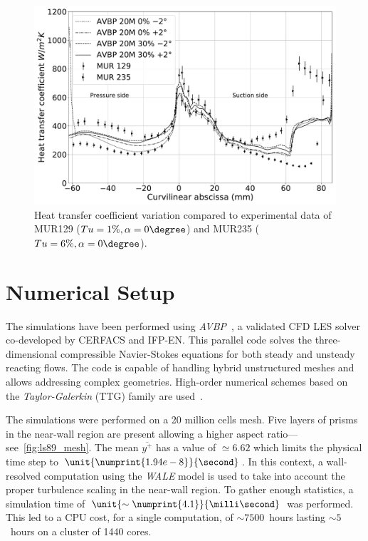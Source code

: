 \begin{figure}[!ht]
\centering
\includegraphics[width=0.9\linewidth,keepaspectratio]{fig/applications/ls89/11_2column_color-online-only_space_tu-alpha.pdf}
\caption{Heat transfer coefficient variation compared to experimental data of MUR129 ($Tu=1\%, \alpha = 0\degree$) and MUR235 ($Tu=6\%, \alpha = 0\degree$).}
\label{fig:space-tu-alpha}
\end{figure}

\section{Numerical Setup}\label{sec:ls89_num}

The simulations have been performed using \textit{AVBP}~\cite{Gicquel2011}, a validated CFD LES solver co-developed by CERFACS and IFP-EN. This parallel code solves the three-dimensional compressible Navier-Stokes equations for both steady and unsteady reacting flows. The code is capable of handling hybrid unstructured meshes and allows addressing complex geometries. High-order numerical schemes based on the \textit{Taylor-Galerkin} (TTG) family are used~\cite{Quartapelle1993}. 

The simulations were performed on a 20 million cells mesh. Five layers of prisms in the near-wall region are present allowing a higher aspect ratio---see~\cref{fig:ls89_mesh}. The mean $\overline{y^+}$ has a value of $\simeq 6.62$ which limits the physical time step to $\unit{\numprint{1.94e-8}}{\second}$. In this context, a wall-resolved computation using the \textit{WALE} \cite{Nicoud1999} model is used to take into account the proper turbulence scaling in the near-wall region. To gather enough statistics, a simulation time of $\unit{\sim\numprint{4.1}}{\milli\second}$ was performed. This led to a CPU cost, for a single computation, of $\sim7500$~hours lasting $\sim5$~hours on a cluster of 1440 cores.


